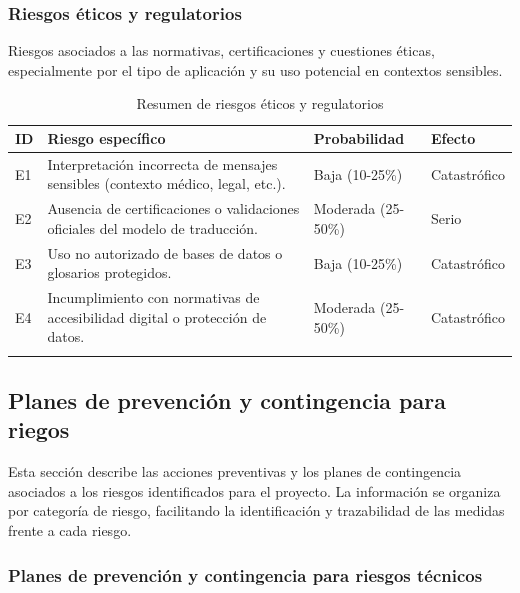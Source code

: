 \subsubsection{Riesgos éticos y regulatorios}
Riesgos asociados a las normativas, certificaciones y cuestiones éticas, especialmente por el tipo de aplicación y su uso potencial en contextos sensibles.

\setlength{\tabcolsep}{4pt}
\renewcommand{\arraystretch}{1.2}

\begin{longtable}{|>{\centering\arraybackslash}p{0.8cm}|>{\raggedright\arraybackslash}p{3.5cm}|>{\raggedright\arraybackslash}p{5.1cm}|>{\raggedright\arraybackslash}p{5.1cm}|}
	\hline
	\textbf{ID} & \textbf{Riesgo específico} & \textbf{Probabilidad} & \textbf{Efecto} \\
	\hline
	E1 & Interpretación incorrecta de mensajes sensibles (contexto médico, legal, etc.). & Baja (10-25\%) & Catastrófico \\
	\hline
	E2 & Ausencia de certificaciones o validaciones oficiales del modelo de traducción. & Moderada (25-50\%) & Serio \\
	\hline
	E3 & Uso no autorizado de bases de datos o glosarios protegidos. & Baja (10-25\%) & Catastrófico \\
	\hline
	E4 & Incumplimiento con normativas de accesibilidad digital o protección de datos. & Moderada (25-50\%) & Catastrófico \\
	\hline
\caption{Resumen de riesgos éticos y regulatorios} 
\label{tab:riesgos_eticos_resumen}
\end{longtable}

\newpage
\subsection{Planes de prevención y contingencia para riegos}

Esta sección describe las acciones preventivas y los planes de contingencia asociados a los riesgos identificados para el proyecto. La información se organiza por categoría de riesgo, facilitando la identificación y trazabilidad de las medidas frente a cada riesgo.

\subsubsection{Planes de prevención y contingencia para riesgos técnicos}

\setlength{\tabcolsep}{4pt}
\renewcommand{\arraystretch}{1.2}

